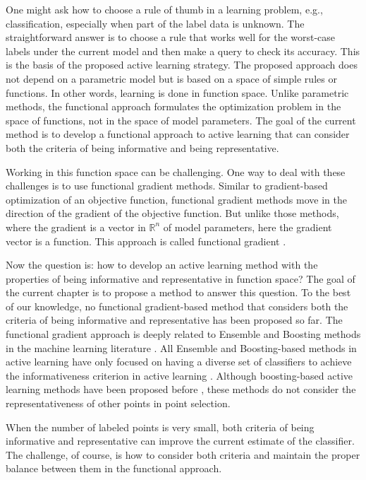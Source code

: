	One might ask how to choose a rule of thumb in a learning problem, e.g., classification, especially when part of the label data is unknown. The straightforward answer is to choose a rule that works well for the worst-case labels under the current model and then make a query to check its accuracy. This is the basis of the proposed active learning strategy. The proposed approach does not depend on a parametric model but is based on a space of simple rules or functions. In other words, learning is done in function space. Unlike parametric methods, the functional approach formulates the optimization problem in the space of functions, not in the space of model parameters. The goal of the current method is to develop a functional approach to active learning that can consider both the criteria of being informative and being representative.
	
	Working in this function space can be challenging. One way to deal with these challenges is to use functional gradient methods. Similar to gradient-based optimization of an objective function, functional gradient methods move in the direction of the gradient of the objective function. But unlike those methods, where the gradient is a vector in $\mathbb{R}^n$ of model parameters, here the gradient vector is a function. This approach is called functional gradient \cite{friedman2001greedy}.
	
	Now the question is: how to develop an active learning method with the properties of being informative and representative in function space? The goal of the current chapter is to propose a method to answer this question. To the best of our knowledge, no functional gradient-based method that considers both the criteria of being informative and representative has been proposed so far. The functional gradient approach is deeply related to Ensemble and Boosting methods in the machine learning literature \cite{friedman2001greedy}. All Ensemble and Boosting-based methods in active learning have only focused on having a diverse set of classifiers to achieve the informativeness criterion in active learning \cite{haas2017active}. Although boosting-based active learning methods have been proposed before \cite{schapire1997boosting}, these methods do not consider the representativeness of other points in point selection.
	
	When the number of labeled points is very small, both criteria of being informative and representative can improve the current estimate of the classifier. The challenge, of course, is how to consider both criteria and maintain the proper balance between them in the functional approach.
	
